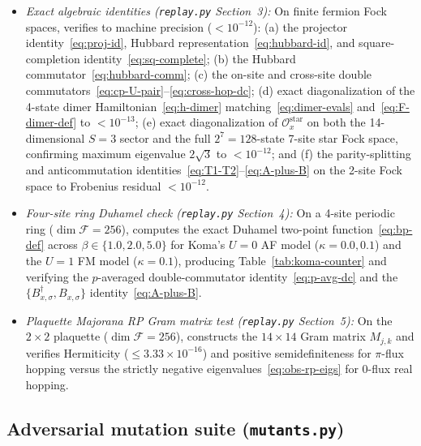 \documentclass[11pt]{article}
\theoremstyle{definition}
\theoremstyle{remark}
\newcommand{\calF}{\mathcal{F}}
\newcommand{\calO}{\mathcal{O}}
\begin{document}
\begin{itemize}[leftmargin=2em]
\item \emph{Exact algebraic identities (\texttt{replay.py} Section~3):} On finite fermion Fock spaces, verifies to machine precision ($< 10^{-12}$): (a) the projector identity~\eqref{eq:proj-id}, Hubbard representation~\eqref{eq:hubbard-id}, and square-completion identity~\eqref{eq:sq-complete}; (b) the Hubbard commutator~\eqref{eq:hubbard-comm}; (c) the on-site and cross-site double commutators~\eqref{eq:cp-U-pair}--\eqref{eq:cross-hop-dc}; (d) exact diagonalization of the 4-state dimer Hamiltonian~\eqref{eq:h-dimer} matching~\eqref{eq:dimer-evals} and~\eqref{eq:F-dimer-def} to $< 10^{-13}$; (e) exact diagonalization of $\calO_x^{\mathrm{star}}$ on both the 14-dimensional $S=3$ sector and the full $2^7 = 128$-state 7-site star Fock space, confirming maximum eigenvalue $2\sqrt{3}$ to $< 10^{-12}$; and (f) the parity-splitting and anticommutation identities~\eqref{eq:T1-T2}--\eqref{eq:A-plus-B} on the 2-site Fock space to Frobenius residual $< 10^{-12}$.
\item \emph{Four-site ring Duhamel check (\texttt{replay.py} Section~4):} On a 4-site periodic ring ($\dim \calF = 256$), computes the exact Duhamel two-point function~\eqref{eq:bp-def} across $\beta \in \{1.0, 2.0, 5.0\}$ for Koma's $U = 0$ AF model ($\kappa = 0.0, 0.1$) and the $U = 1$ FM model ($\kappa = 0.1$), producing Table~\ref{tab:koma-counter} and verifying the $p$-averaged double-commutator identity~\eqref{eq:p-avg-dc} and the $\{B_{x,\sigma}^\dagger, B_{x,\sigma}\}$ identity~\eqref{eq:A-plus-B}.
\item \emph{Plaquette Majorana RP Gram matrix test (\texttt{replay.py} Section~5):} On the $2 \times 2$ plaquette ($\dim \calF = 256$), constructs the $14 \times 14$ Gram matrix $M_{j,k}$ and verifies Hermiticity ($\le 3.33 \times 10^{-16}$) and positive semidefiniteness for $\pi$-flux hopping versus the strictly negative eigenvalues~\eqref{eq:obs-rp-eigs} for $0$-flux real hopping.
\end{itemize}

\subsection{Adversarial mutation suite (\texttt{mutants.py})}\label{app:mutants}
\end{document}
